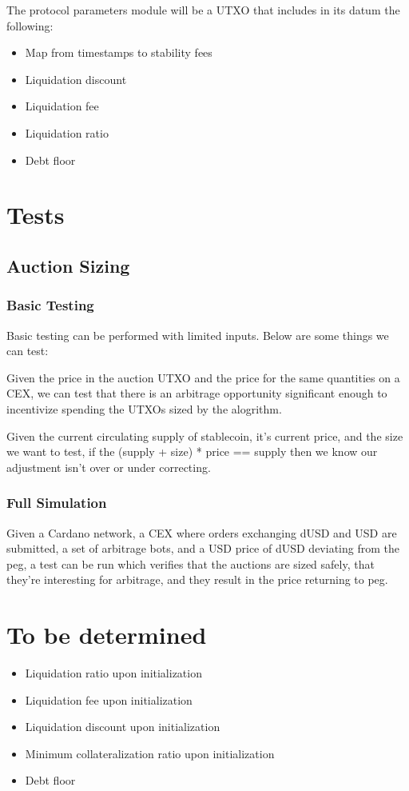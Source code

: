 \documentclass{article} %
\begin{document}
The protocol parameters module will be a UTXO that includes in its datum the following:
\begin{itemize}
  \item Map from timestamps to stability fees
  \item Liquidation discount
  \item Liquidation fee
  \item Liquidation ratio
  \item Debt floor
\end{itemize}

\section{Tests}

\subsection{Auction Sizing}

\subsubsection{Basic Testing}

Basic testing can be performed with limited inputs. Below are some things we can test:

Given the price in the auction UTXO and the price for the same quantities on a CEX, we can test
that there is an arbitrage opportunity significant enough to incentivize spending the UTXOs
sized by the alogrithm.

Given the current circulating supply of stablecoin, it's current price, and the size we 
want to test, if the (supply + size) * price == supply then we know our adjustment
isn't over or under correcting.

\subsubsection{Full Simulation}

Given a Cardano network, a CEX where orders exchanging dUSD and USD are submitted, a set of
arbitrage bots, and a USD price of dUSD deviating from the peg, a test can be run which
verifies that the auctions are sized safely, that they're interesting for arbitrage, and they
result in the price returning to peg.

% 

\section{To be determined}

\begin{itemize}
  \item Liquidation ratio upon initialization
  \item Liquidation fee upon initialization
  \item Liquidation discount upon initialization
  \item Minimum collateralization ratio upon initialization
  \item Debt floor
\end{itemize}
\end{document}
